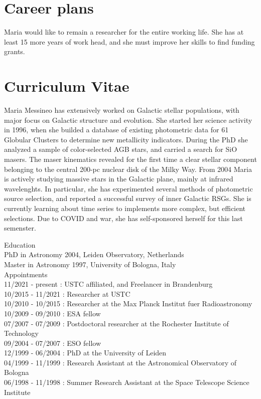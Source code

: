 \documentclass[final,11pt,onecolumn,a4paper,twoside]{scrbook_gj}
\begin{document}
\section{ Career plans}
Maria would like to remain a researcher for the entire working life.
She has at least 15 more years of work head, and she must 
improve her skills to find funding grants. 

\newpage
\section{  Curriculum Vitae }
\vspace{1. cm}

\vspace{1. cm}
Maria Messineo has extensively worked on Galactic stellar populations,
with major focus on Galactic structure and evolution.
She started her science activity in  1996, when she builded a 
database of existing photometric data for 61 Globular Clusters 
to determine  new metallicity indicators. 
During the PhD she analyzed a sample of color-selected AGB stars, 
and carried a search for SiO masers.  
The maser kinematics revealed for the first time a clear 
stellar component belonging to the central 200-pc nuclear disk 
of the Milky Way.   From 2004 Maria is actively  
studying   massive stars in the Galactic plane, 
mainly at infrared wavelenghts. In particular, she
has experimented several methods of  photometric source
selection, and reported a successful survey of inner 
Galactic RSGs. She is currently learning
about time series to implements more complex, but efficient
selections. Due to COVID and war, she has 
self-sponsored herself for this last semenster. 


\vspace{1.2 cm}
\noindent Education\\
PhD in Astronomy 2004, Leiden Observatory, Netherlands\\
Master in Astronomy 1997, University of  Bologna, Italy\\

\vspace{1.2 cm}
\noindent Appointments\\
11/2021 - present : USTC affiliated, and Freelancer in Brandenburg \\
10/2015 - 11/2021 : Researcher at USTC\\
10/2010 - 10/2015 : Researcher at the Max Planck Institut fuer Radioastronomy\\
10/2009 - 09/2010 : ESA fellow \\
07/2007 - 07/2009 : Postdoctoral researcher at the Rochester Institute of Technology\\
09/2004 - 07/2007 : ESO fellow\\
12/1999 - 06/2004 : PhD at the University of Leiden\\
04/1999 - 11/1999 : Research Assistant at the Astronomical Observatory of Bologna\\
06/1998 - 11/1998 : Summer Research Assistant at the Space Telescope Science Institute \\
         			     
				
\printindex
\end{document}
